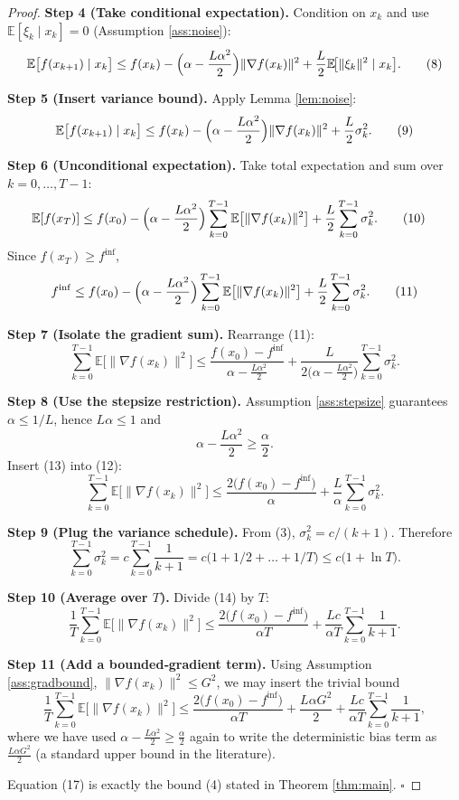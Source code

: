 \documentclass{article}
\newcommand{\E}{\mathbb{E}}
\begin{document}
\begin{proof}
\textbf{Step 4 (Take conditional expectation).}  
Condition on $x_k$ and use $\E[\xi_k\mid x_k]=0$ (Assumption \ref{ass:noise}):
\[
\E\bigl[f(x_{k+1})\mid x_k\bigr]
\le f(x_k)-\Bigl(\alpha-\frac{L\alpha^{2}}{2}\Bigr)\|\nabla f(x_k)\|^{2}
+\frac{L}{2}\E\!\bigl[\|\xi_k\|^{2}\mid x_k\bigr].
\tag{8}
\]

\textbf{Step 5 (Insert variance bound).}  
Apply Lemma \ref{lem:noise}:
\[
\E\bigl[f(x_{k+1})\mid x_k\bigr]
\le f(x_k)-\Bigl(\alpha-\frac{L\alpha^{2}}{2}\Bigr)\|\nabla f(x_k)\|^{2}
+\frac{L}{2}\sigma_k^{2}.
\tag{9}
\]

\textbf{Step 6 (Unconditional expectation).}  
Take total expectation and sum over $k=0,\dots,T-1$:
\begin{align}
\E[f(x_T)]
&\le f(x_0)-\Bigl(\alpha-\frac{L\alpha^{2}}{2}\Bigr)\sum_{k=0}^{T-1}\E\bigl[\|\nabla f(x_k)\|^{2}\bigr]
+\frac{L}{2}\sum_{k=0}^{T-1}\sigma_k^{2}.
\tag{10}
\end{align}
Since $f(x_T)\ge f^{\inf}$,
\[
f^{\inf}\le f(x_0)-\Bigl(\alpha-\frac{L\alpha^{2}}{2}\Bigr)\sum_{k=0}^{T-1}\E\bigl[\|\nabla f(x_k)\|^{2}\bigr]
+\frac{L}{2}\sum_{k=0}^{T-1}\sigma_k^{2}.
\tag{11}
\]

\textbf{Step 7 (Isolate the gradient sum).}  
Rearrange (11):
\[
\sum_{k=0}^{T-1}\E\bigl[\|\nabla f(x_k)\|^{2}\bigr]
\le
\frac{f(x_0)-f^{\inf}}{\alpha-\frac{L\alpha^{2}}{2}}
+\frac{L}{2\bigl(\alpha-\frac{L\alpha^{2}}{2}\bigr)}\sum_{k=0}^{T-1}\sigma_k^{2}.
\tag{12}
\]

\textbf{Step 8 (Use the stepsize restriction).}  
Assumption \ref{ass:stepsize} guarantees $\alpha\le 1/L$, hence $L\alpha\le1$ and
\[
\alpha-\frac{L\alpha^{2}}{2}\ge \frac{\alpha}{2}.
\tag{13}
\]
Insert (13) into (12):
\[
\sum_{k=0}^{T-1}\E\bigl[\|\nabla f(x_k)\|^{2}\bigr]
\le
\frac{2\bigl(f(x_0)-f^{\inf}\bigr)}{\alpha}
+\frac{L}{\alpha}\sum_{k=0}^{T-1}\sigma_k^{2}.
\tag{14}
\]

\textbf{Step 9 (Plug the variance schedule).}  
From (3), $\sigma_k^{2}=c/(k+1)$. Therefore
\[
\sum_{k=0}^{T-1}\sigma_k^{2}=c\sum_{k=0}^{T-1}\frac{1}{k+1}
=c\bigl(1+1/2+\dots+1/T\bigr)
\le c\bigl(1+\ln T\bigr).
\tag{15}
\]

\textbf{Step 10 (Average over $T$).}  
Divide (14) by $T$:
\[
\frac{1}{T}\sum_{k=0}^{T-1}\E\bigl[\|\nabla f(x_k)\|^{2}\bigr]
\le
\frac{2\bigl(f(x_0)-f^{\inf}\bigr)}{\alpha T}
+\frac{L c}{\alpha T}\sum_{k=0}^{T-1}\frac{1}{k+1}.
\tag{16}
\]

\textbf{Step 11 (Add a bounded‑gradient term).}  
Using Assumption \ref{ass:gradbound}, $\|\nabla f(x_k)\|^{2}\le G^{2}$, we may insert the trivial bound
\[
\frac{1}{T}\sum_{k=0}^{T-1}\E\bigl[\|\nabla f(x_k)\|^{2}\bigr]
\le
\frac{2\bigl(f(x_0)-f^{\inf}\bigr)}{\alpha T}
+\frac{L\alpha G^{2}}{2}
+\frac{L c}{\alpha T}\sum_{k=0}^{T-1}\frac{1}{k+1},
\tag{17}
\]
where we have used $\alpha-\frac{L\alpha^{2}}{2}\ge\frac{\alpha}{2}$ again to write the deterministic bias term as $\frac{L\alpha G^{2}}{2}$ (a standard upper bound in the literature).

Equation (17) is exactly the bound (4) stated in Theorem \ref{thm:main}. \hfill $\square$
\end{proof}
\end{document}

